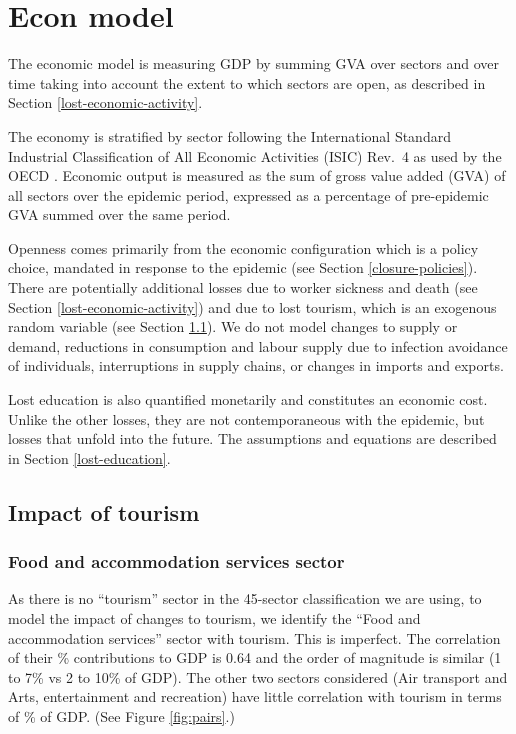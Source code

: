 \documentclass[
]{article}
\begin{document}
\section{Econ model}\label{econ-model}

The economic model is measuring GDP by summing GVA over sectors and over time taking into account the extent to which sectors are open, as described in Section \ref{lost-economic-activity}.

The economy is stratified by sector following the International Standard Industrial Classification of All Economic Activities (ISIC) Rev.~4 as used by the OECD \citep{un}. Economic output is measured as the sum of gross value added (GVA) of all sectors over the epidemic period, expressed as a percentage of pre-epidemic GVA summed over the same period.

Openness comes primarily from the economic configuration which is a policy choice, mandated in response to the epidemic (see Section \ref{closure-policies}). There are potentially additional losses due to worker sickness and death (see Section \ref{lost-economic-activity}) and due to lost tourism, which is an exogenous random variable (see Section \ref{impact-of-tourism}). We do not model changes to supply or demand, reductions in consumption and labour supply due to infection avoidance of individuals, interruptions in supply chains, or changes in imports and exports.

Lost education is also quantified monetarily and constitutes an economic cost. Unlike the other losses, they are not contemporaneous with the epidemic, but losses that unfold into the future. The assumptions and equations are described in Section \ref{lost-education}.

\subsection{Impact of tourism}\label{impact-of-tourism}

\subsubsection{Food and accommodation services sector}\label{food-and-accommodation-services-sector}

As there is no ``tourism'' sector in the 45-sector classification we are using, to model the impact of changes to tourism, we identify the ``Food and accommodation services'' sector with tourism. This is imperfect. The correlation of their \% contributions to GDP is 0.64 and the order of magnitude is similar (1 to 7\% vs 2 to 10\% of GDP). The other two sectors considered (Air transport and Arts, entertainment and recreation) have little correlation with tourism in terms of \% of GDP. (See Figure \ref{fig:pairs}.)
\end{document}
